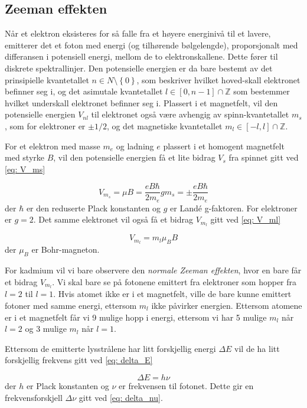 \documentclass[reprint,norsk,notitlepage,floatfix]{revtex4-2}
\begin{document}
  \subsection{Zeeman effekten}
    Når et elektron eksisteres for så falle fra et høyere energinivå til et lavere, emitterer det et foton med energi (og tilhørende bølgelengde), proporsjonalt med differansen i potensiell energi, mellom de to elektronskallene. Dette fører til diskrete spektrallinjer. Den potensielle energien er da bare bestemt av det prinsipielle kvantetallet $n ∈ N \setminus \left\{0\right\}$, som beskriver hvilket hoved-skall elektronet befinner seg i, og det asimutale kvantetallet $l ∈ [0, n-1]∩ℤ$ som bestemmer hvilket underskall elektronet befinner seg i. Plassert i et magnetfelt, vil den potensielle energien $V_{nl}$ til elektronet også være avhengig av spinn-kvantetallet $m_s$, som for elektroner er $\pm 1 / 2$, og det magnetiske kvantetallet $m_l ∈ [-l, l]∩ℤ$.
    
    For et elektron med masse $m_e$ og ladning $e$ plassert i et homogent magnetfelt med styrke $B$, vil den potensielle energien få et lite bidrag $V_s$ fra spinnet gitt ved \cref{eq: V_ms}
    
    \begin{equation}\label{eq: V_ms}
      V_{m_s} = μB = \frac{eBℏ}{2m_e}g m_s = ± \frac{eBℏ}{2m_e}
    \end{equation}
    der $ℏ$ er den reduserte Plack konstanten og $g$ er Landé g-faktoren. For elektroner er $g = 2$. Det samme elektronet vil også få et bidrag $V_{m_l}$ gitt ved \cref{eq: V_ml}
    
    \begin{equation}\label{eq: V_ml}
      V_{m_l} = m_l μ_B B
    \end{equation}
    der $μ_B$ er Bohr-magneton. 
    
    For kadmium vil vi bare observere den \textit{normale Zeeman effekten}, hvor en bare får et bidrag $V_{m_l}$. Vi skal bare se på fotonene emittert fra elektroner som hopper fra $l=2$ til $l=1$. Hvis atomet ikke er i et magnetfelt, ville de bare kunne emittert fotoner med samme energi, ettersom $m_l$ ikke påvirker energien. Ettersom atomene er i et magnetfelt får vi 9 mulige hopp i energi, ettersom vi har 5 mulige $m_l$ når $l=2$ og 3 mulige $m_l$ når $l=1$.
  
    Ettersom de emitterte lysstrålene har litt forskjellig energi $ΔE$ vil de ha litt forskjellig frekvens gitt ved \cref{eq: delta_E}
    
    \begin{equation}\label{eq: delta_E}
      ΔE = h ν
    \end{equation}
    der $h$ er Plack konstanten og $ν$ er frekvensen til fotonet. Dette gir en frekvensforskjell $Δν$ gitt ved \cref{eq: delta_nu}. 
\end{document}

